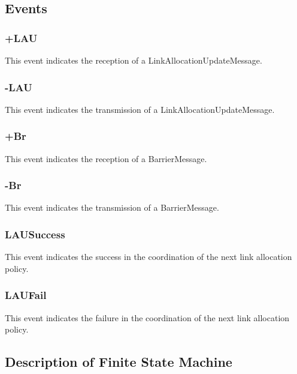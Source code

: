 \subsection{Events}

\subsubsection{+LAU}
This event indicates the reception of a LinkAllocationUpdateMessage.

\subsubsection{-LAU}
This event indicates the transmission of a LinkAllocationUpdateMessage.

\subsubsection{+Br}
This event indicates the reception of a BarrierMessage.

\subsubsection{-Br}
This event indicates the transmission of a BarrierMessage.

\subsubsection{LAUSuccess}
This event indicates the success in the coordination of the next link allocation policy.

\subsubsection{LAUFail}
This event indicates the failure in the coordination of the next link allocation policy.

\newpage

\subsection{Description of Finite State Machine}

